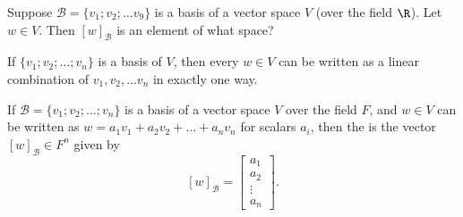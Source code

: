 \edXsolution{
  
}

\endedxproblem

\endedxvertical









Suppose $\mathcal{B} = \{v_1; v_2; \ldots v_9\}$ is a basis of a vector space $V$ (over the field $\R$).  Let $w \in V$.  Then  $[w]_{\mathcal{B}}$ is an element of what space?  




\endedxproblem

\endedxvertical





{}  If $\{v_1; v_2; \ldots ; v_n\}$ is a basis of $V$, then every $w\in V$
can be written as a linear combination of $v_1, v_2, \ldots v_n$ in exactly one way.  


{} If  $\mathcal{B} = \{v_1; v_2; \ldots ; v_n\}$ is a basis of a vector space $V$ over the field $F$, and 
$w\in V$ can be written as $w = a_1v_1 + a_2v_2 + \ldots + a_n v_n$ for scalars $a_i$, then 
the {} is the vector $[w]_{\mathcal{B}} \in F^n$
given by 
\[ [w]_{\mathcal{B}} = \left[ \begin{array}{c} a_1 \\ a_2 \\ \vdots \\ a_n \end{array} \right]. \]

\endedxtext




\endedxvertical





